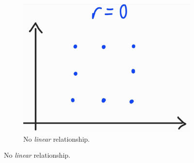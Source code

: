 \documentclass[../Notes.tex]{subfiles}
\begin{document}
\begin{figure}[htbp]
  \centering
  \begin{subfigure}[c]{0.4\textwidth}
    \centering
    \includegraphics[width=\textwidth]{../images/product-moment-correlation-coefficient/r-is-0.jpg}
    \caption{No \emph{linear} relationship.}
  \end{subfigure}


\end{figure}
\end{document}
